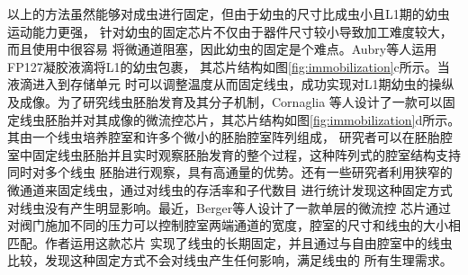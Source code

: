 	以上的方法虽然能够对成虫进行固定，但由于幼虫的尺寸比成虫小且L1期的幼虫运动能力更强，
	针对幼虫的固定芯片不仅由于器件尺寸较小导致加工难度较大，而且使用中很容易
	将微通道阻塞，因此幼虫的固定是个难点。Aubry等人\cite{Aubry2015Hydrogel}运用FP127凝胶液滴将L1的幼虫包裹，
	其芯片结构如图\ref{fig:immobilization}c所示。当液滴进入到存储单元
	时可以调整温度从而固定线虫，成功实现对L1期幼虫的操纵及成像。为了研究线虫胚胎发育及其分子机制，Cornaglia
	等人\cite{Cornaglia2015An}设计了一款可以固定线虫胚胎并对其成像的微流控芯片，其芯片结构如图\ref{fig:immobilization}d所示。其由一个线虫培养腔室和许多个微小的胚胎腔室阵列组成，
	研究者可以在胚胎腔室中固定线虫胚胎并且实时观察胚胎发育的整个过程，这种阵列式的腔室结构支持同时对多个线虫
	胚胎进行观察，具有高通量的优势。还有一些研究者利用狭窄的微通道来固定线虫\cite{Lee2014A,Hulme2007A}，通过对线虫的存活率和子代数目
	进行统计发现这种固定方式对线虫没有产生明显影响。最近，Berger等人\cite{berger2018long}设计了一款单层的微流控
	芯片通过对阀门施加不同的压力可以控制腔室两端通道的宽度，腔室的尺寸和线虫的大小相匹配。作者运用这款芯片
	实现了线虫的长期固定，并且通过与自由腔室中的线虫比较，发现这种固定方式不会对线虫产生任何影响，满足线虫的
	所有生理需求。
